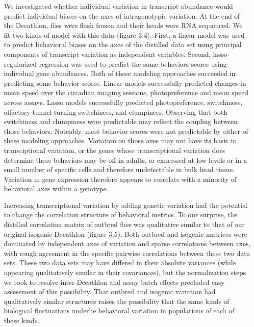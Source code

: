 \documentclass[12pt,letterpaper]{article}
\begin{document}
We investigated whether individual variation in transcript abundance would predict individual biases on the axes of intragenotypic variation. At the end of the Decathlon, flies were flash frozen and their heads were RNA sequenced. We fit two kinds of model with this data (figure 3.4). First, a linear model was used to predict behavioral biases on the axes of the distilled data set using principal components of transcript variation as independent variables. Second, lasso-regularized regression was used to predict the same behaviors scores using individual gene abundances. Both of these modeling approaches succeeded in predicting some behavior scores. Linear models successfully predicted changes in mean speed over the circadian imaging sessions, photopreference and mean speed across assays. Lasso models successfully predicted photopreference, switchiness, olfactory tunnel turning switchiness, and clumpiness. Observing that both switchiness and clumpiness were predictable may reflect the coupling between those behaviors. Noteably, most behavior scores were not predictable by either of these modeling approaches. Variation on those axes may not have its basis in transciptional variation, or the genes whose transcriptional variation does determine these behaviors may be off in adults, or expressed at low levels or in a small number of specific cells and therefore undetectable in bulk head tissue. Variation in gene expression therefore appears to correlate with a minority of behavioral axes within a genotype.

Increasing transcriptional variation by adding genetic variation had the potential to change the correlation structure of behavioral metrics. To our surprise, the distilled correlation matrix of outbred flies was qualitative similar to that of our original isogenic Decathlon (figure 3.5). Both outbred and isogenic matrices were dominated by independent axes of variation and sparse correlations between axes, with rough agreement in the specific pairwise correlations between these two data sets. These two data sets may have differed in their absolute variances (while appearing qualitatively similar in their covariances), but the normalization steps we took to resolve inter-Decathlon and assay batch effects precluded easy assessment of this possibility. That outbred and isogenic variation had qualitatively similar structures raises the possibility that the same kinds of biological fluctuations underlie behavioral variation in populations of each of these kinds. 
\end{document}
